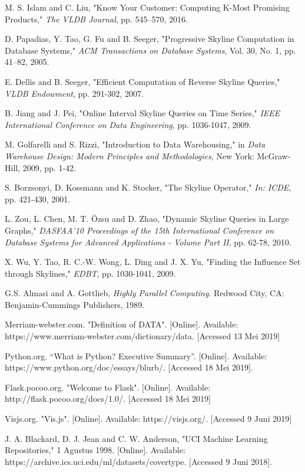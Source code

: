 \begin{thebibliography}{9}
	M. S. Islam and C. Liu, "Know Your Customer: Computing K-Most Promising Products," \textit{The VLDB Journal}, pp. 545–570, 2016.
	
	D. Papadias, Y. Tao, G. Fu and B. Seeger, "Progressive Skyline Computation in Database Systems," \textit{ACM Transactions on Database Systems}, Vol. 30, No. 1, pp. 41–82, 2005.
	
	E. Dellis and B. Seeger, "Efficient Computation of Reverse Skyline Queries," \textit{VLDB Endowment}, pp. 291-302, 2007.
	
	B. Jiang and J. Pei, "Online Interval Skyline Queries on Time Series," \textit{IEEE International Conference on Data Engineering}, pp. 1036-1047, 2009.
	
	M. Golfarelli and S. Rizzi, "Introduction to Data Warehousing," in \textit{Data Warehouse Design: Modern Principles and Methodologies}, New York: McGraw-Hill, 2009, pp. 1-42. 
	
	S. Borzsonyi, D. Kossmann and K. Stocker, "The Skyline Operator," \textit{In: ICDE}, pp. 421-430, 2001.
	
	L. Zou, L. Chen, M. T. Özsu and D. Zhao, "Dynamic Skyline Queries in Large Graphs," \textit{DASFAA'10 Proceedings of the 15th International Conference on Database Systems for Advanced Applications - Volume Part II}, pp. 62-78, 2010.
	
	X. Wu, Y. Tao, R. C.-W. Wong, L. Ding and J. X. Yu, "Finding the Influence Set through Skylines," \textit{EDBT}, pp. 1030-1041, 2009.
	
	G.S. Almasi and A. Gottlieb, \textit{Highly Parallel Computing}. Redwood City, CA: Benjamin-Cummings Publishers, 1989.
	
	Merriam-webster.com. "Definition of DATA". [Online]. Available: https://www.merriam-webster.com/dictionary/data. [Accessed 13 Mei 2019]
	
	Python.org. “What is Python? Executive Summary”. [Online]. Available: https://www.python.org/doc/essays/blurb/. [Accessed 18 Mei 2019].
	
	Flask.pocoo.org. "Welcome to Flask". [Online]. Available: http://flask.pocoo.org/docs/1.0/. [Accessed 18 Mei 2019]
	
	Visjs.org. "Vis.js". [Online]. Available: https://visjs.org/. [Accessed 9 Juni 2019]
	
	J. A. Blackard, D. J. Jean and C. W. Anderson, "UCI
	Machine Learning Repositories," 1 Agustus 1998. [Online].
	Available: https://archive.ics.uci.edu/ml/datasets/covertype.
	[Accessed 9 Juni 2018].
		
\end{thebibliography}
